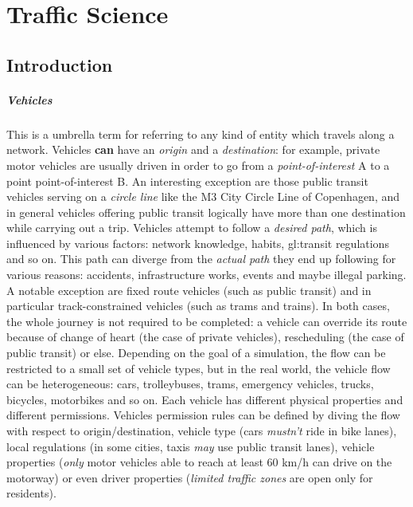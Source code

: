 \chapter{Traffic Science}
\label{chapter:traffic-science}

\section{Introduction}

\paragraph{Vehicles}

This is a umbrella term for referring to any kind of entity which travels along a network.
Vehicles \textbf{can} have an \textit{origin} and a \textit{destination}: for example, private motor vehicles are usually driven in order to go from a \textit{point-of-interest} A to a point point-of-interest B.
An interesting exception are those public transit vehicles serving on a \textit{circle line} like the M3 City Circle Line of Copenhagen, and in general vehicles offering public transit logically have more than one destination while carrying out a trip.
Vehicles attempt to follow a \textit{desired path}, which is influenced by various factors: network knowledge, habits, \gls{gl:transit} regulations and so on.
This path can diverge from the \textit{actual path} they end up following for various reasons: accidents, infrastructure works, events and maybe illegal parking.
A notable exception are fixed route vehicles (such as public transit) and in particular track-constrained vehicles (such as trams and trains).
In both cases, the whole journey is not required to be completed: a vehicle can override its route because of change of heart (the case of private vehicles), rescheduling (the case of public transit) or else.
Depending on the goal of a simulation, the flow can be restricted to a small set of vehicle types, but in the real world, the vehicle flow can be heterogeneous: cars, trolleybuses, trams, emergency vehicles, trucks, bicycles, motorbikes and so on. Each vehicle has different physical properties and different permissions.
Vehicles permission rules can be defined by diving the flow with respect to origin/destination, vehicle type (cars \textit{mustn't} ride in bike lanes), local regulations (in some cities, taxis \textit{may} use public transit lanes), vehicle properties (\textit{only} motor vehicles able to reach at least 60 km/h can drive on the motorway) or even driver properties (\textit{limited traffic zones} are open only for residents).
